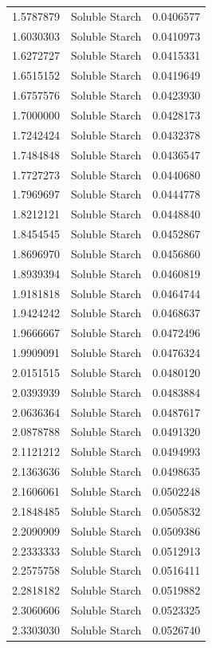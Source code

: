 \documentclass[
  12pt,
]{article}
\begin{document}
{\begin{longtable}[]{@{}rlr@{}}
1.5787879 & Soluble Starch & 0.0406577 \\
1.6030303 & Soluble Starch & 0.0410973 \\
1.6272727 & Soluble Starch & 0.0415331 \\
1.6515152 & Soluble Starch & 0.0419649 \\
1.6757576 & Soluble Starch & 0.0423930 \\
1.7000000 & Soluble Starch & 0.0428173 \\
1.7242424 & Soluble Starch & 0.0432378 \\
1.7484848 & Soluble Starch & 0.0436547 \\
1.7727273 & Soluble Starch & 0.0440680 \\
1.7969697 & Soluble Starch & 0.0444778 \\
1.8212121 & Soluble Starch & 0.0448840 \\
1.8454545 & Soluble Starch & 0.0452867 \\
1.8696970 & Soluble Starch & 0.0456860 \\
1.8939394 & Soluble Starch & 0.0460819 \\
1.9181818 & Soluble Starch & 0.0464744 \\
1.9424242 & Soluble Starch & 0.0468637 \\
1.9666667 & Soluble Starch & 0.0472496 \\
1.9909091 & Soluble Starch & 0.0476324 \\
2.0151515 & Soluble Starch & 0.0480120 \\
2.0393939 & Soluble Starch & 0.0483884 \\
2.0636364 & Soluble Starch & 0.0487617 \\
2.0878788 & Soluble Starch & 0.0491320 \\
2.1121212 & Soluble Starch & 0.0494993 \\
2.1363636 & Soluble Starch & 0.0498635 \\
2.1606061 & Soluble Starch & 0.0502248 \\
2.1848485 & Soluble Starch & 0.0505832 \\
2.2090909 & Soluble Starch & 0.0509386 \\
2.2333333 & Soluble Starch & 0.0512913 \\
2.2575758 & Soluble Starch & 0.0516411 \\
2.2818182 & Soluble Starch & 0.0519882 \\
2.3060606 & Soluble Starch & 0.0523325 \\
2.3303030 & Soluble Starch & 0.0526740 \\

\end{longtable}}
\end{document}
